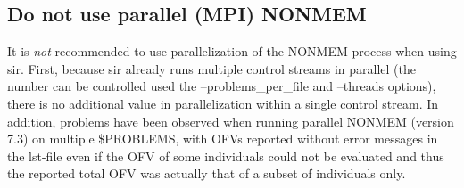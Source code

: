\subsection*{Do not use parallel (MPI) NONMEM}
It is \emph{not} recommended to use parallelization of the NONMEM process when using sir. First, because sir already runs multiple control streams in parallel (the number can be controlled used the –problems\_per\_file and –threads options), there is no additional value in parallelization within a single control stream. In addition, problems have been observed when running parallel NONMEM (version 7.3) on multiple \$PROBLEMS, with OFVs reported without error messages in the lst-file even if the OFV of some individuals could not be evaluated and thus the reported total OFV was actually that of a subset of individuals only.





